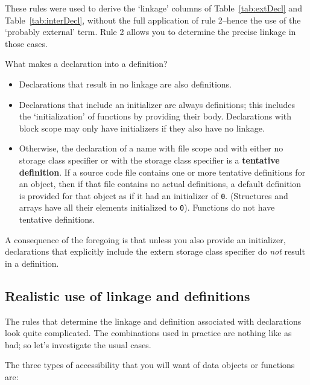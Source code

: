    These rules were used to derive the `linkage' columns of
     Table~\ref{tab:extDecl} and Table~\ref{tab:interDecl}, without the full
    application of rule 2--hence the use of the `probably
    external' term. Rule 2 allows you to determine the precise linkage in
    those cases.


   What makes a declaration into a definition?


   \begin{itemize}
    \item Declarations that result in no linkage are also definitions.

    \item Declarations that include an initializer are always definitions;
     this includes the `initialization' of functions by providing their
     body. Declarations with block scope may only have initializers if
     they also have no linkage.

    \item Otherwise, the declaration of a name with file scope and with
     either no storage class specifier or with the \static{}
     storage class specifier is a \textbf{tentative definition}. If
     a source code file contains one or more tentative definitions for
     an object, then if that file contains no actual definitions, a
     default definition is provided for that object as if it had an
     initializer of \texttt{0}. (Structures and arrays have
     all their elements initialized to \texttt{0}). Functions
     do not have tentative definitions.
   \end{itemize}

   A consequence of the foregoing is that unless you also provide an
    initializer, declarations that explicitly include the extern storage
    class specifier do \textit{not} result in a definition.


  

  \subsection{Realistic use of linkage and definitions}
   

   The rules that determine the linkage and definition associated with
    declarations look quite complicated. The combinations used in practice
    are nothing like as bad; so let's investigate the usual cases.


   The three types of accessibility that you will want of data objects or
    functions are:


